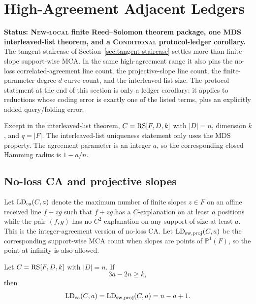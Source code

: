 
\section{High-Agreement Adjacent Ledgers}
\label{sec:high-agreement-adjacent-ledgers}

\textbf{Status: \textsc{New-local} finite Reed--Solomon theorem package,
one MDS interleaved-list theorem, and a \textsc{Conditional} protocol-ledger
corollary.}
The tangent staircase of Section~\ref{sec:tangent-staircase} settles more than
finite-slope support-wise MCA.  In the same high-agreement range it also pins
the no-loss correlated-agreement line count, the projective-slope line count,
the finite-parameter degree-\(d\) curve count, and the interleaved-list size.
The protocol statement at the end of this section is only a ledger corollary:
it applies to reductions whose coding error is exactly one of the listed
terms, plus an explicitly added query/folding error.

Except in the interleaved-list theorem, \(C=\operatorname{RS}[F,D,k]\) with
\(|D|=n\), dimension \(k\), and \(q=|F|\).  The interleaved-list uniqueness
statement only uses the MDS property.  The agreement parameter is an integer
\(a\), so the corresponding closed Hamming radius is \(1-a/n\).

\subsection{No-loss CA and projective slopes}

Let \(\operatorname{LD}_{\rm ca}(C,a)\) denote the maximum number of finite
slopes \(z\in F\) on an affine received line \(f+zg\) such that \(f+zg\) has a
\(C\)-explanation on at least \(a\) positions while the pair \((f,g)\) has no
\(C^2\)-explanation on any support of size at least \(a\).  This is the
integer-agreement version of no-loss CA.  Let
\(\operatorname{LD}_{\rm sw,proj}(C,a)\) be the corresponding support-wise MCA
count when slopes are points of \(\mathbb P^1(F)\), so the point at infinity is
also allowed.

\begin{theorem}
\label{thm:ca-projective-tangent-staircase}
Let \(C=\operatorname{RS}[F,D,k]\) with \(|D|=n\).  If
\[
  3a-2n\ge k,
\]
then
\[
  \operatorname{LD}_{\rm ca}(C,a)
  =
  \operatorname{LD}_{\rm sw,proj}(C,a)
  =
  n-a+1 .
\]
\end{theorem}

